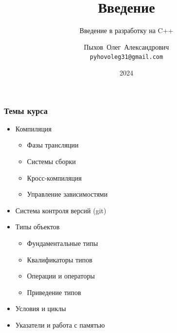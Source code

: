 \documentclass[compress]{beamer}
\title{Введение}
\subtitle{Введение в разработку на C++}
\author{Пыхов~Олег~Александрович\inst{1} \\ \texttt{pyhovoleg31@gmail.com}}
\institute{
    \inst{1}%
    ООО~"Прософт-Системы"
}
\date{2024}
\begin{document}
\frame[plain]{\titlepage}

\begin{frame}

    \frametitle{Темы курса}

    \begin{itemize}

        \item Компиляция

            \begin{itemize}

                \item Фазы трансляции

                \item Системы сборки

                \item Кросс-компиляция

                \item Управление зависимостями

            \end{itemize}

        \item Система контроля версий (git)

        \item Типы объектов

            \begin{itemize}

                \item Фундаментальные типы

                \item Квалификаторы типов

                \item Операции и операторы

                \item Приведение типов

            \end{itemize}

        \item Условия и циклы

        \item Указатели и работа с памятью

    \end{itemize}

\end{frame}
\end{document}
